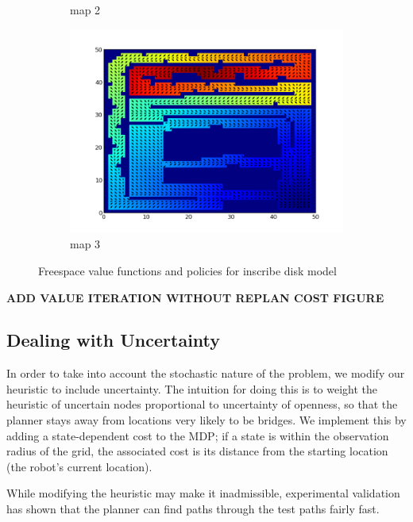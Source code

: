 \documentclass{article}
\begin{document}
\begin{figure}[h]
\begin{subfigure}[b]{0.45\textwidth}
        \caption{map 2}
        \label{fig:map2value}
    \end{subfigure}
    \begin{subfigure}[b]{0.45\textwidth}
        \includegraphics[width = \textwidth]{map3value.png}
        \caption{map 3}
        \label{fig:map3value}
    \end{subfigure}
    \caption{Freespace value functions and policies for inscribe disk model}
    \label{fig:valuefcns}
\end{figure}
\textbf{ADD VALUE ITERATION WITHOUT REPLAN COST FIGURE}

\subsection{Dealing with Uncertainty}

In order to take into account the stochastic nature of the problem, we modify our heuristic to include uncertainty. The intuition for doing this is to weight the heuristic of uncertain nodes proportional to uncertainty of openness, so that the planner stays away from locations very likely to be bridges. We implement this by adding a state-dependent cost to the MDP; if a state is within the observation radius of the grid, the associated cost is its distance from the starting location (the robot's current location).

While modifying the heuristic may make it inadmissible, experimental validation has shown that the planner can find paths through the test paths fairly fast.
\end{document}
